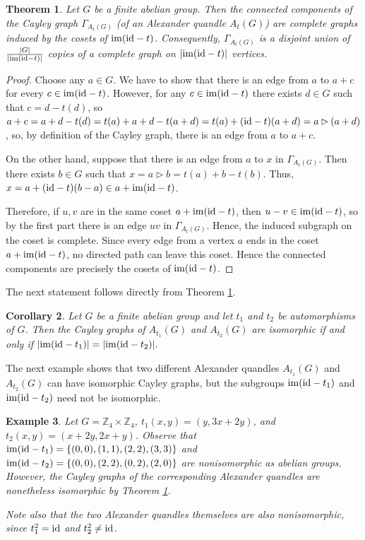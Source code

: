\documentclass[english,11pt]{amsart}
\newtheorem{Theorem}{Theorem}[section]
\newtheorem{Corollary}[Theorem]{Corollary}
\newtheorem{Example}[Theorem]{Example}
\newcommand{\ZZ}{\mathbb{Z}}
\newcommand{\id}{{\rm id}}
\newcommand{\im}{{\rm im}}
\begin{document}
\begin{Theorem}
\label{alexanderiso}
 Let $G$ be a finite abelian group.  Then the connected components of the Cayley graph  $\Gamma_{A_t(G)}$ (of an Alexander quandle $A_t(G)$) are complete graphs induced by the cosets of $\im(\id-t)$. Consequently, $\Gamma_{A_t(G)}$ is a disjoint union of $\frac{|G|}{|\im(\id-t)|}$ copies of a complete graph on $|\im(\id-t)|$ vertices.
\end{Theorem}
\begin{proof}
    Choose any $a \in G$. We have to show that there is an edge from $a$ to $a+c$ for every $c \in \im(\id-t)$. However, for any $c \in \im(\id-t)$ there exists $d \in G$ such that $c=d-t(d)$, so $a+c=a+d-t(d)=t(a)+a+d-t(a+d)= t(a)+(\id-t)(a+d) = a \rhd (a+d)$, so, by definition of the Cayley graph, there is an edge from $a$ to $a+c$.
    
    On the other hand, suppose that there is an edge from $a$ to $x$ in $\Gamma_{A_t(G)}$.
    Then there exists $b \in G$ such that $x=a \rhd b=t(a)+b-t(b)$. Thus, $x=a+(\id-t)(b-a) \in a + \im(\id-t)$.
    
    Therefore, if $u,v$ are in the same coset $a+\im(\id-t)$, then 
$u-v \in \im(\id-t)$, so by the first part there is an edge 
$uv$ in $\Gamma_{A_t(G)}$. Hence, the induced subgraph on the coset is complete. Since every edge from a vertex $a$ ends in the coset $a+\im(\id-t)$, no directed path can leave this coset. Hence the connected components are precisely the cosets of $\im(\id-t)$.
\end{proof}

The next statement follows directly from  Theorem \ref{alexanderiso}.

\begin{Corollary}
    Let $G$ be a finite abelian group and let $t_1$  and $t_2$ be automorphisms of $G$. Then the Cayley graphs of $A_{t_1}(G)$ and $A_{t_2}(G)$ are isomorphic if and only if $|\im(\id-t_1)|=|\im(\id-t_2)|.$
\end{Corollary}

The next example shows that two different Alexander quandles $A_{t_1}(G)$ and $A_{t_2}(G)$ can have isomorphic Cayley graphs, but the subgroups $\im(\id-t_1)$ and $\im(\id-t_2)$ need not be isomorphic.

\begin{Example}
    Let $G=\ZZ_4 \times \ZZ_4$, $t_1(x,y)=(y,3x+2y)$, and $t_2(x,y)=(x+2y,2x+y)$. Observe that $\im(\id-t_1)=\{(0,0),(1,1),(2,2),(3,3)\}$ and $\im(\id-t_2)=\{(0,0),(2,2),(0,2),(2,0)\}$ are nonisomorphic as abelian groups. However, the Cayley graphs of the corresponding Alexander quandles are nonetheless isomorphic by Theorem \ref{alexanderiso}. 
    
    Note also that the two Alexander quandles themselves are also nonisomorphic, since $t_1^2=\id$ and $t_2^2 \neq \id$.
\end{Example}
\end{document}
